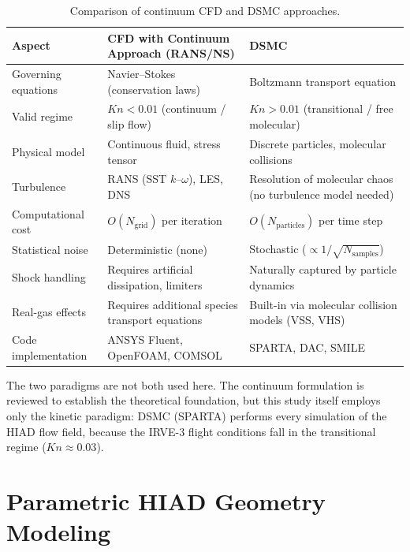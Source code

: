 \begin{table}[H]
    \centering
    \caption{Comparison of continuum CFD and DSMC approaches.}
    \label{tab:cfd_vs_dsmc}
    \begin{tabularx}{\textwidth}{|>{\RaggedRight\arraybackslash}p{}|>{\RaggedRight\arraybackslash}X|>{\RaggedRight\arraybackslash}X|}
    \hline
    \textbf{Aspect} & \textbf{CFD with Continuum Approach (RANS/NS)} & \textbf{DSMC} \\ \hline
    Governing equations & Navier--Stokes (conservation laws) & Boltzmann transport equation \\ \hline
    Valid regime & $Kn < 0.01$ (continuum / slip flow) & $Kn > 0.01$ (transitional / free molecular) \\ \hline
    Physical model & Continuous fluid, stress tensor & Discrete particles, molecular collisions \\ \hline
    Turbulence & RANS (SST $k$--$\omega$), LES, DNS & Resolution of molecular chaos (no turbulence model needed) \\ \hline
    Computational cost & $O(N_{\text{grid}})$ per iteration & $O(N_{\text{particles}})$ per time step \\ \hline
    Statistical noise & Deterministic (none) & Stochastic ($\propto 1/\sqrt{N_{\text{samples}}}$) \\ \hline
    Shock handling & Requires artificial dissipation, limiters & Naturally captured by particle dynamics \\ \hline
    Real-gas effects & Requires additional species transport equations & Built-in via molecular collision models (VSS, VHS) \\ \hline
    Code implementation & ANSYS Fluent, OpenFOAM, COMSOL & SPARTA, DAC, SMILE \\ \hline
    \end{tabularx}
\end{table}

\noindent The two paradigms are not both used here. The continuum formulation is reviewed to establish the theoretical foundation, but this study itself employs only the kinetic paradigm: DSMC (SPARTA) performs every simulation of the HIAD flow field, because the IRVE-3 flight conditions fall in the transitional regime ($Kn \approx 0.03$).

\section{Parametric HIAD Geometry Modeling}

